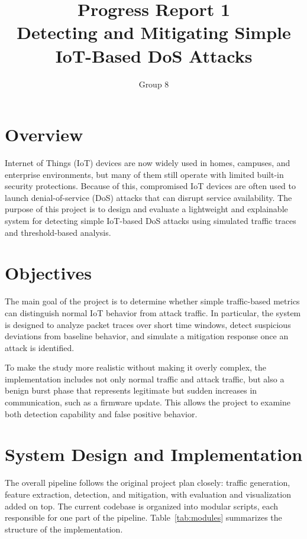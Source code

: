 \documentclass[11pt]{article}
\title{Progress Report 1\\\textbf{Detecting and Mitigating Simple IoT-Based DoS Attacks}}
\author{Group 8}
\date{}
\begin{document}
\maketitle

\section*{Overview}
Internet of Things (IoT) devices are now widely used in homes, campuses, and enterprise environments, but many of them still operate with limited built-in security protections. Because of this, compromised IoT devices are often used to launch denial-of-service (DoS) attacks that can disrupt service availability. The purpose of this project is to design and evaluate a lightweight and explainable system for detecting simple IoT-based DoS attacks using simulated traffic traces and threshold-based analysis.


\section*{Objectives}
The main goal of the project is to determine whether simple traffic-based metrics can distinguish normal IoT behavior from attack traffic. In particular, the system is designed to analyze packet traces over short time windows, detect suspicious deviations from baseline behavior, and simulate a mitigation response once an attack is identified.

To make the study more realistic without making it overly complex, the implementation includes not only normal traffic and attack traffic, but also a benign burst phase that represents legitimate but sudden increases in communication, such as a firmware update. This allows the project to examine both detection capability and false positive behavior.

\section*{System Design and Implementation}
The overall pipeline follows the original project plan closely: traffic generation, feature extraction, detection, and mitigation, with evaluation and visualization added on top. The current codebase is organized into modular scripts, each responsible for one part of the pipeline. Table~\ref{tab:modules} summarizes the structure of the implementation.
\end{document}
